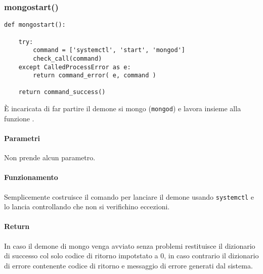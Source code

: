 \documentclass[11pt]{article}
\begin{document}
\subsubsection{mongostart()}\label{mongostart}
\begin{lstlisting}
def mongostart():
    
    try:
        command = ['systemctl', 'start', 'mongod']
        check_call(command)
    except CalledProcessError as e:
        return command_error( e, command )

    return command_success()
\end{lstlisting}
È incaricata di far partire il demone si mongo (\texttt{mongod}) e lavora insieme alla funzione .
\paragraph{Parametri}
Non prende alcun parametro.
\paragraph{Funzionamento}
Semplicemente costruisce il comando per lanciare il demone usando \texttt{systemctl} e lo lancia controllando
che non si verifichino eccezioni.
\paragraph{Return}
In caso il demone di mongo venga avviato senza problemi restituisce il dizionario di successo col solo codice di ritorno
impotstato a 0, in caso contrario il dizionario di errore contenente codice di ritorno e messaggio di errore generati dal sistema.
\end{document}
